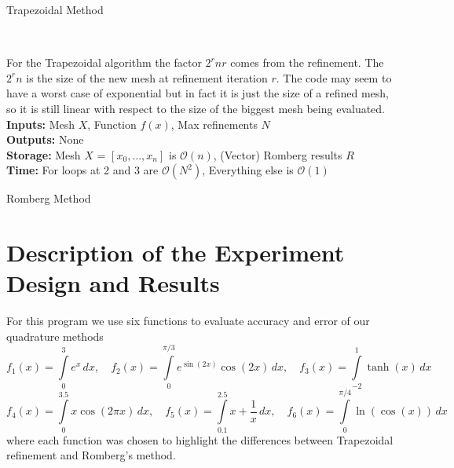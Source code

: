 \documentclass[12pt]{article}
\theoremstyle{remark}
\begin{document}
\begin{algorithm}[H]
	\caption{Trapezoidal Method}
	\begin{algorithmic}[1]
		\EndFor
		\EndFor
		\EndWhile \\
		\Return{}
	\end{algorithmic}
\end{algorithm}

For the Trapezoidal algorithm the factor $2^rnr$ comes from the refinement. The $2^rn$ is the size of the new mesh at refinement iteration $r$. The code may seem to have a worst case of exponential but in fact it is just the size of a refined mesh, so it is still linear with respect to the size of the biggest mesh being evaluated. \\

\textbf{Inputs:} Mesh $X$, Function $f(x)$, Max refinements $N$ \\
\textbf{Outputs:} None \\
\textbf{Storage:} Mesh $X$ = $[x_0, \dots, x_n]$ is $\mathcal{O}(n)$, (Vector) Romberg results $R$ \\
\textbf{Time:} For loops at 2 and 3 are $\mathcal{O}(N^2)$, Everything else is $\mathcal{O}(1)$
\begin{algorithm}[H]
	\caption{Romberg Method}
	\begin{algorithmic}[1]
	\EndFor
	\EndFor
	\end{algorithmic}
\end{algorithm}

\newpage

\section{Description of the Experiment Design and Results}

For this program we use six functions to evaluate accuracy and error of our quadrature methods
$$
	f_1(x) = \int\limits_0^3 e^x \,dx, \quad f_2(x) = \int\limits_0^{\pi/3} e^{\sin(2x)}\cos(2x) \, dx, \quad f_3(x) = \int\limits_{-2}^1 \tanh(x) \, dx
$$
$$
	f_4(x) = \int\limits_0^{3.5} x\cos(2\pi x) \, dx, \quad f_5(x) = \int\limits_{0.1}^{2.5} x + \frac{1}{x} \, dx, \quad f_6(x) = \int\limits_0^{\pi/4} \ln(\cos(x)) \, dx
$$
where each function was chosen to highlight the differences between Trapezoidal refinement and Romberg's method.
\end{document}
